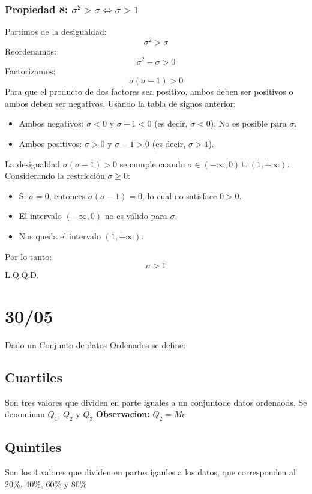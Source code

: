 \documentclass[12pt, letterpaper]{article}
\begin{document}
            \subsubsection{Propiedad 8: $\sigma^2 > \sigma \iff \sigma > 1$}
                Partimos de la desigualdad:
                \[\sigma^2 > \sigma \]
                Reordenamos:
                \[\sigma^2-\sigma > 0 \]
                Factorizamos:
                \[\sigma(\sigma-1) > 0 \]
                Para que el producto de dos factores sea positivo, ambos deben ser positivos o ambos deben ser negativos. Usando la tabla de signos anterior:
                \begin{itemize}
                    \item Ambos negativos: $\sigma < 0$ y $\sigma-1 < 0$ (es decir, $\sigma < 0$). No es posible para $\sigma$.
                    \item Ambos positivos: $\sigma > 0$ y $\sigma-1 > 0$ (es decir, $\sigma > 1$).
                \end{itemize}
                La desigualdad $\sigma(\sigma-1) > 0$ se cumple cuando $\sigma \in (-\infty, 0) \cup (1, +\infty)$.
                Considerando la restricción $\sigma \ge 0$:
                \begin{itemize}
                    \item Si $\sigma=0$, entonces $\sigma(\sigma-1)=0$, lo cual no satisface $0>0$.
                    \item El intervalo $(-\infty,0)$ no es válido para $\sigma$.
                    \item Nos queda el intervalo $(1, +\infty)$.
                \end{itemize}
                Por lo tanto:
                \[\sigma > 1\]
                L.Q.Q.D.
                \newpage



\section{30/05}
Dado un Conjunto de datos Ordenados se define:

\subsection{Cuartiles}
Son tres valores que dividen en parte iguales a un conjuntode datos ordenaods. Se denominan $Q_1$, $Q_2$ y $Q_3$
\textbf{Observacion:} $Q_2 = Me$

\subsection{Quintiles}
Son los 4 valores que dividen en partes igaules a los datos, que corresponden al 20\%, 40\%, 60\% y 80\%
\end{document}
